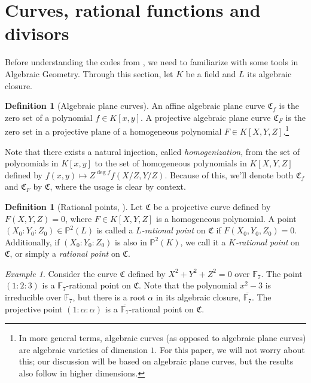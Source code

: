 \documentclass[11pt, oneside]{amsart}
\theoremstyle{definition}
\newtheorem{defn}[thm]{Definition}
\theoremstyle{remark}
\newtheorem*{exmp*}{Example}
\numberwithin{equation}{section}
\begin{document}
\section{Curves, rational functions and divisors}

Before understanding the codes from \cite{TVZ82}, we need to familiarize with some tools in Algebraic Geometry.
Through this section, let $K$ be a field and $L$ its algebraic closure.

\begin{defn}[Algebraic plane curves]
	An affine algebraic plane curve $\mathfrak C_f$ is the zero set of a polynomial $f \in K[x, y]$.
	A projective algebraic plane curve $\mathfrak C_F$ is the zero set in a projective plane of a homogeneous polynomial $F \in K[X, Y, Z]$.\footnote{In more general terms, algebraic curves (as opposed to algebraic plane curves) are algebraic varieties of dimension $1$. For this paper, we will not worry about this; our discussion will be based on algebraic plane curves, but the results also follow in higher dimensions.}
\end{defn}

Note that there exists a natural injection, called \emph{homogenization}, from the set of polynomials in $K[x, y]$ to the set of homogeneous polynomials in $K[X, Y, Z]$ defined by $f(x, y) \mapsto Z^{\deg f}f(X/Z, Y/Z)$.
Because of this, we'll denote both $\mathfrak C_f$ and $\mathfrak C_F$ by $\mathfrak C$, where the usage is clear by context.

\begin{defn}[Rational points, \cite{Wal00}] %
	Let $\mathfrak C$ be a projective curve defined by $F(X, Y, Z) = 0$, where $F \in K[X, Y, Z]$ is a homogeneous polynomial.
	A point $(X_0 : Y_0 : Z_0) \in \mathbb{P}^2(L)$ is called a \emph{$L$-rational point} on $\mathfrak C$ if $F(X_0, Y_0, Z_0) = 0$.
	Additionally, if $(X_0 : Y_0 : Z_0)$ is also in $\mathbb{P}^2(K)$, we call it a \emph{$K$-rational point} on $\mathfrak C$, or simply a \emph{rational point} on $\mathfrak C$.
\end{defn}

\begin{exmp*}
	Consider the curve $\mathfrak C$ defined by $X^2 + Y^2 + Z^2 = 0$ over $\mathbb{F}_7$.
	The point $(1 : 2 : 3)$ is a $\mathbb{F}_7$-rational point on $\mathfrak C$.
	Note that the polynomial $x^2 - 3$ is irreducible over $\mathbb{F}_7$, but there is a root $\alpha$ in its algebraic closure, $\overline{\mathbb{F}_7}$. The projective point $(1 :  \alpha : \alpha)$ is a $\overline{\mathbb{F}_7}$-rational point on $\mathfrak C$.
\end{exmp*}
\end{document}
